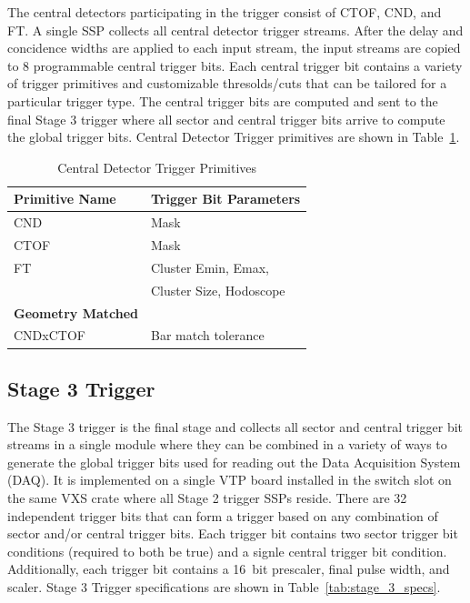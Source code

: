 The central detectors participating in the trigger consist of CTOF, CND, and FT. A single SSP collects all central detector trigger streams. After the delay and concidence widths are applied to each input stream, the input streams are copied to 8 programmable central trigger bits. Each central trigger bit contains a variety of trigger primitives and customizable thresolds/cuts that can be tailored for a particular trigger type. The central trigger bits are computed and sent to the final Stage 3 trigger where all sector and central trigger bits arrive to compute the global trigger bits. Central Detector Trigger primitives are shown in Table~\ref{tab:cd_trig_primitives}.

\begin{table}
\begin{center}
	\begin{tabular}{| l | l |}
		\hline \hline
		Primitive Name			& Trigger Bit Parameters	\\
		\hline
		CND     			& Mask				\\
		CTOF    			& Mask				\\
		FT				& Cluster Emin, Emax, 		\\
						& Cluster Size, Hodoscope	\\
		{\bf Geometry Matched}		&				\\
		CNDxCTOF			& Bar match tolerance		\\
		\hline \hline
	\end{tabular}
\end{center}
\caption{Central Detector Trigger Primitives}
\label{tab:cd_trig_primitives}
\end{table}


\subsection{Stage 3 Trigger}

The Stage 3 trigger is the final stage and collects all sector and central trigger bit streams in a single module where they can be combined in a variety of ways to generate the global trigger bits used for reading out the Data Acquisition System (DAQ). It is implemented on a single VTP board installed in the switch slot on the same VXS crate where all Stage 2 trigger SSPs reside. There are 32 independent trigger bits that can form a trigger based on any combination of sector and/or central trigger bits. Each trigger bit contains two sector trigger bit conditions (required to both be true) and a signle central trigger bit condition. Additionally, each trigger bit contains a 16~bit prescaler, final pulse width, and scaler. Stage 3 Trigger specifications are shown in Table~\ref{tab:stage_3_specs}.

